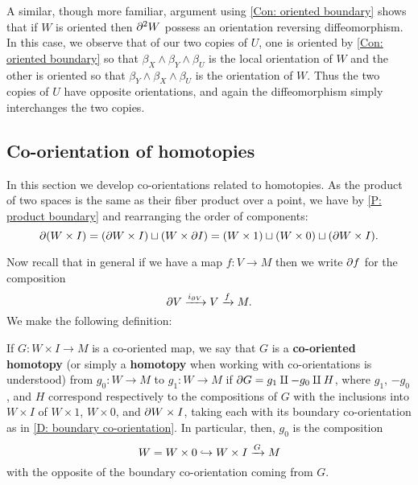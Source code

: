 \begin{remark}\label{R: bd2 oriented}
	A similar, though more familiar, argument using \cref{Con: oriented boundary} shows that if $W$ is oriented then $\partial^2 W$ possess an orientation reversing diffeomorphism.
	In this case, we observe that of our two copies of $U$, one is oriented by \cref{Con: oriented boundary} so that $\beta_X \wedge \beta_Y \wedge \beta_U$ is the local orientation of $W$ and the other is oriented so that $\beta_Y \wedge \beta_X \wedge \beta_U$ is the orientation of $W$.
	Thus the two copies of $U$ have opposite orientations, and again the diffeomorphism simply interchanges the two copies.
\end{remark}

\subsection{Co-orientation of homotopies}\label{S: co-oriented homotopy}

In this section we develop co-orientations related to homotopies.
As the product of two spaces is the same as their fiber product over a point, we have by \cref{P: product boundary} and rearranging the order of components:
\begin{equation*}
	\partial(W \times I) =
	(\partial W \times I) \sqcup (W \times \partial I) =
	(W \times 1) \sqcup (W \times 0) \sqcup (\partial W \times I).
\end{equation*}

Now recall that in general if we have a map $f \colon V \to M$ then we write $\partial f$ for the composition
$$\partial V \xrightarrow{i_{\partial V}} V \xrightarrow{f} M.$$
We make the following definition:

\begin{definition}\label{D: co-oriented homotopy}
	If $G \colon W \times I \to M$ is a co-oriented map, we say that $G$ is a \textbf{co-oriented homotopy} (or simply a \textbf{homotopy} when working with co-orientations is understood) from $g_0 \colon W \to M$ to $g_1 \colon W \to M$ if $\partial G = g_1 \amalg -g_0\amalg H$, where $g_1$, $-g_0$, and $H$ correspond respectively to the compositions of $G$ with the inclusions into $W \times I$ of $W \times 1$, $W \times 0$, and $\partial W \times I$, taking each with its boundary co-orientation as in \cref{D: boundary co-orientation}.
	In particular, then, $g_0$ is the composition
	$$W=W \times 0 \hookrightarrow W \times I \xrightarrow{G} M$$
	with the opposite of the boundary co-orientation coming from $G$.
\end{definition}

